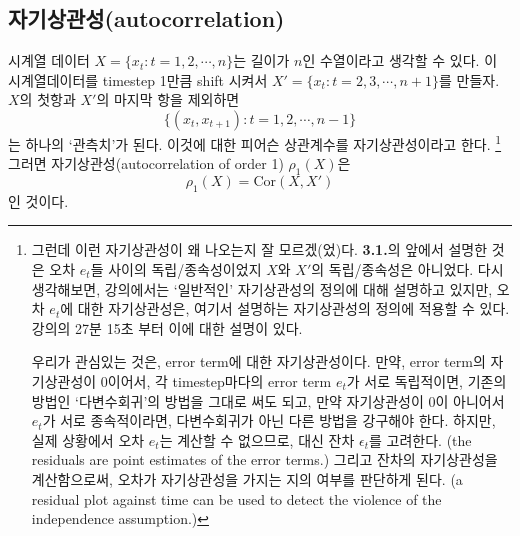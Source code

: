 \documentclass{article}
\begin{document}
\subsection{자기상관성(autocorrelation)}
시계열 데이터 \(X=\{x_t:t=1,2,\cdots, n\}\)는 길이가 \(n\)인 수열이라고 생각할 수 있다.
이 시계열데이터를 timestep 1만큼 shift 시켜서 \(X'=\{x_t:t=2,3,\cdots, n+1\}\)를 만들자.
\(X\)의 첫항과 \(X'\)의 마지막 항을 제외하면
\[\{(x_t,x_{t+1}):t=1,2,\cdots,n-1\}\]
는 하나의 `관측치'가 된다.
이것에 대한 피어슨 상관계수를 자기상관성이라고 한다.
\footnote{그런데 이런 자기상관성이 왜 나오는지 잘 모르겠(었)다.
\textbf{3.1.}의 앞에서 설명한 것은 오차 \(e_t\)들 사이의 독립/종속성이었지 \(X\)와 \(X'\)의 독립/종속성은 아니었다.
다시 생각해보면, 강의에서는 `일반적인' 자기상관성의 정의에 대해 설명하고 있지만, 오차 \(e_t\)에 대한 자기상관성은, 여기서 설명하는 자기상관성의 정의에 적용할 수 있다.
강의의 27분 15초 부터 이에 대한 설명이 있다.

우리가 관심있는 것은, error term에 대한 자기상관성이다.
만약, error term의 자기상관성이 0이어서, 각 timestep마다의 error term \(e_t\)가 서로 독립적이면, 기존의 방법인 `다변수회귀'의 방법을 그대로 써도 되고, 만약 자기상관성이 0이 아니어서 \(e_t\)가 서로 종속적이라면, 다변수회귀가 아닌 다른 방법을 강구해야 한다.
하지만, 실제 상황에서 오차 \(e_t\)는 계산할 수 없으므로, 대신 잔차 \(\epsilon_t\)를 고려한다. (the residuals are point estimates of the error terms.)
그리고 잔차의 자기상관성을 계산함으로써, 오차가 자기상관성을 가지는 지의 여부를 판단하게 된다. (a residual plot against time can be used to detect the violence of the independence assumption.)}
그러면 자기상관성(autocorrelation of order 1) \(\rho_1(X)\)은\footnotemark
\begin{equation}\label{autocorrelation}
\rho_1(X)=\text{Cor}(X,X')
\end{equation}
인 것이다.
\end{document}

